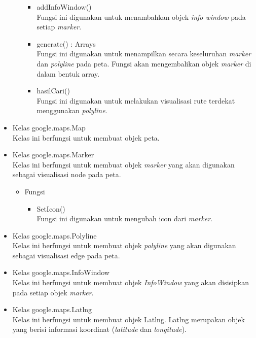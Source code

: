 \begin{itemize}
\begin{itemize}
\begin{itemize}
      \item addInfoWindow()\\
      Fungsi ini digunakan untuk menambahkan objek \textit{info window} pada
      setiap \textit{marker}.
      
      \item generate() : Arrays\\
      Fungsi ini digunakan untuk menampilkan secara keseluruhan \textit{marker}
      dan \textit{polyline} pada peta. Fungsi akan mengembalikan
      objek \textit{marker} di dalam bentuk array.
      
      \item hasilCari()\\
      Fungsi ini digunakan untuk melakukan visualisasi rute terdekat menggunakan
      \textit{polyline}.
    \end{itemize}
  \end{itemize}
  
  \item Kelas google.maps.Map\\
  Kelas ini berfungsi untuk membuat objek peta.
  
  \item Kelas google.maps.Marker\\
  Kelas ini berfungsi untuk membuat objek \textit{marker} yang akan digunakan
  sebagai visualisasi node pada peta.
  \begin{itemize}
    \item Fungsi
    \begin{itemize}
      \item SetIcon()\\
      Fungsi ini digunakan untuk mengubah icon dari \textit{marker}.
    \end{itemize}
  \end{itemize}
  
  \item Kelas google.maps.Polyline\\
  Kelas ini berfungsi untuk membuat objek \textit{polyline} yang akan digunakan
  sebagai visualisasi edge pada peta.
  
  \item Kelas google.maps.InfoWindow\\
  Kelas ini berfungsi untuk membuat objek \textit{InfoWindow} yang akan
  disisipkan pada setiap objek \textit{marker}.
  
  \item Kelas google.maps.Latlng\\
  Kelas ini berfungsi untuk membuat objek Latlng. Latlng merupakan objek yang
  berisi informasi koordinat (\textit{latitude} dan \textit{longitude}).
  

\end{itemize}
